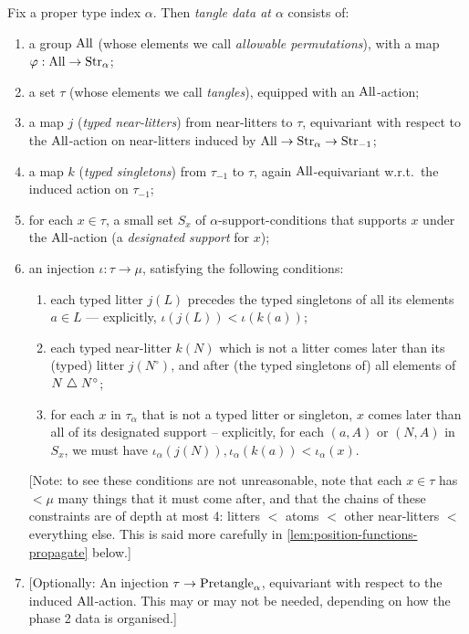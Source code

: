 \begin{definition}
  \label{def:tangle-data}
  \leanok

  Fix a proper type index $\alpha$.  Then \emph{tangle data at $\alpha$} consists of:
  \begin{enumerate}
    \item a group $\mathrm{All}$ (whose elements we call \emph{allowable permutations}), with a map $\varphi : \mathrm{All} \to \mathrm{Str}_\alpha$;
    \item a set $\tau$ (whose elements we call \emph{tangles}), equipped with an $\mathrm{All}$-action;
    \item a map $j$ (\emph{typed near-litters}) from near-litters to $\tau$, equivariant with respect to the $\mathrm{All}$-action on near-litters induced by $\mathrm{All} \to \mathrm{Str}_{\alpha} \to \mathrm{Str}_{-1}$;
    \item a map $k$ (\emph{typed singletons}) from $\tau_{-1}$ to $\tau$, again $\mathrm{All}$-equivariant w.r.t.\ the induced action on $\tau_{-1}$;
    \item for each $x \in \tau$, a small set $S_x$ of $\alpha$-support-conditions that supports $x$ under the $\mathrm{All}$-action (a \emph{designated support} for $x$);
    \item an injection $\iota : \tau \to \mu$, satisfying the following conditions:
    \begin{enumerate}
      \item each typed litter $j(L)$ precedes the typed singletons of all its elements $a \in L$ --- explicitly, $\iota(j(L)) < \iota(k(a))$;

      \item each typed near-litter $k(N)$ which is not a litter comes later than its (typed) litter $j(N^\circ)$, and after (the typed singletons of) all elements of $N \mathrel{\triangle} N^\circ$;

      \item for each $x$ in $\tau_\alpha$ that is not a typed litter or singleton, $x$ comes later than all of its designated support -- explicitly, for each $(a,A)$ or $(N,A)$ in $S_x$, we must have $\iota_\alpha(j(N)), \iota_\alpha(k(a))<\iota_\alpha(x)$.
    \end{enumerate}
    [Note: to see these conditions are not unreasonable, note that each $x \in \tau$ has $<\mu$ many things that it must come after, and that the chains of these constraints are of depth at most 4: litters $<$ atoms $<$ other near-litters $<$ everything else.  This is said more carefully in \cref{lem:position-functions-propagate} below.]
    \item {[Optionally: An injection $\tau \to \mathrm{Pretangle}_\alpha$, equivariant with respect to the induced $\mathrm{All}$-action.  This may or may not be needed, depending on how the phase 2 data is organised.]}
  \end{enumerate}


\end{definition}
